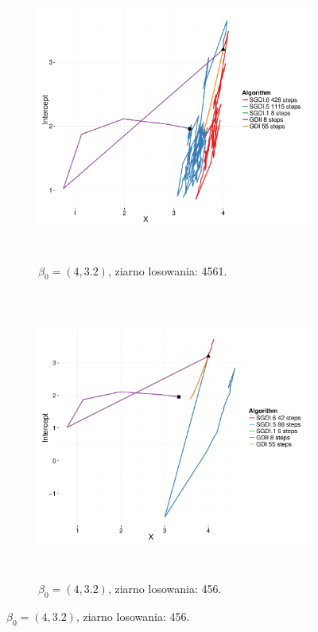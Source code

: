 \begin{figure}[hbt!]
  \begin{center}
   \begin{subfigure}[h!]{0.9\textwidth}
      \includegraphics[width=\textwidth, height=270pt]{Obrazki/sgd_32_4_1.pdf}
      \caption{$\beta_0 = (4,3.2)$, ziarno losowania: 4561.}
   \end{subfigure}     
   \begin{subfigure}[h!]{0.9\textwidth}
      \includegraphics[width=\textwidth, height=270pt]{Obrazki/sgd_32_4_2.pdf}
      \caption{$\beta_0 = (4,3.2)$, ziarno losowania: 456.}
   \end{subfigure}  \end{center}

\end{figure}
